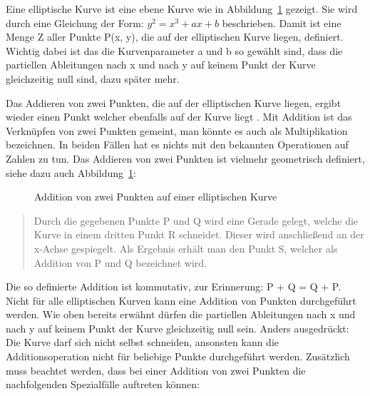 		Eine elliptische Kurve ist eine ebene Kurve wie in Abbildung~\ref{ABBILDUNG_elliptischenKurveAddition} gezeigt. Sie wird durch eine Gleichung der Form: $y^2 = x^3 + ax +b$ beschrieben. Damit ist eine Menge Z aller Punkte P(x, y), die auf der elliptischen Kurve liegen, definiert. Wichtig dabei ist das die Kurvenparameter a und b so gewählt sind, dass die partiellen Ableitungen nach x und nach y auf keinem Punkt der Kurve gleichzeitig null sind, dazu später mehr.
		
		Das Addieren von zwei Punkten, die auf der elliptischen Kurve liegen, ergibt wieder einen Punkt welcher ebenfalls auf der Kurve liegt \cite{Information:und:Kommunikation}. Mit Addition ist das Verknüpfen von zwei Punkten gemeint, man könnte es auch als Multiplikation bezeichnen. In beiden Fällen hat es nichts mit den bekannten Operationen auf Zahlen zu tun. Das Addieren von zwei Punkten ist vielmehr geometrisch definiert, siehe dazu auch Abbildung~\ref{ABBILDUNG_elliptischenKurveAddition}:
		
		\begin{figure}
			\centering
			\caption{Addition von zwei Punkten auf einer elliptischen Kurve~\cite{Information:und:Kommunikation}}
			\label{ABBILDUNG_elliptischenKurveAddition}
		\end{figure}
		
		\begin{quote}
			\begin{defi}
				Durch die gegebenen Punkte P und Q wird eine Gerade gelegt, welche die Kurve in einem dritten Punkt R schneidet. Dieser wird anschließend an der x-Achse 
				gespiegelt. Als Ergebnis erhält man den Punkt S, welcher als Addition von P und Q bezeichnet wird.\cite{Information:und:Kommunikation}
			\end{defi}
		\end{quote}
		
		Die so definierte Addition ist kommutativ, zur Erinnerung: P + Q = Q + P. Nicht für alle elliptischen Kurven kann eine Addition von Punkten durchgeführt werden. Wie oben bereits erwähnt dürfen die partiellen Ableitungen nach x und nach y auf keinem Punkt der Kurve gleichzeitig null sein. Anders ausgedrückt: Die Kurve darf sich nicht selbst schneiden, ansonsten kann die Additionsoperation nicht für beliebige Punkte durchgeführt werden.
		Zusätzlich muss beachtet werden, dass bei einer Addition von zwei Punkten die nachfolgenden Spezialfälle auftreten können\cite{Information:und:Kommunikation}:
		
